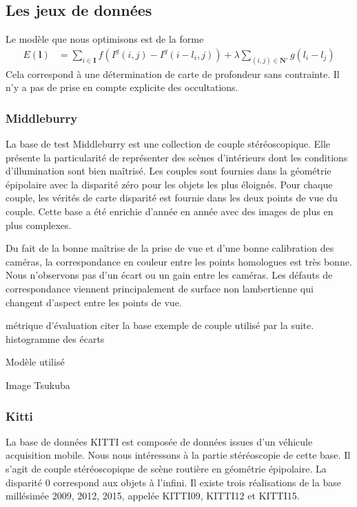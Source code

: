 \documentclass[../main/These_Mathias_Paget.tex]{subfiles}
\begin{document}
\subsection{Les jeux de données}

Le modèle que nous optimisons est de la forme
\begin{equation}
\begin{aligned}
E(\boldsymbol{l}) &= \sum_{i \in \boldsymbol{I}}{ f( I^g(i,j) - I^g(i-l_i,j) )} + 
\lambda \sum_{(i,j) \in \boldsymbol{N'}}{ g(l_i-l_j) }
\end{aligned}
\end{equation}
Cela correspond à une détermination de carte de profondeur sans contrainte. Il n'y a pas de prise en compte explicite des occultations.

\subsubsection{Middleburry}

La base de test Middleburry est une collection de couple stéréoscopique. Elle présente la particularité de représenter des scènes d'intérieurs dont les conditions d’illumination sont bien maîtrisé. Les couples sont fournies dans la géométrie épipolaire avec la disparité zéro pour les objets les plus éloignés. Pour chaque couple, les vérités de carte disparité est fournie dans les deux points de vue du couple. Cette base a été enrichie d'année en année avec des images de plus en plus complexes.

Du fait de la bonne maîtrise de la prise de vue et d'une bonne calibration des caméras, la correspondance en couleur entre les points homologues est très bonne. Nous n'observons pas d'un écart ou un gain entre les caméras. Les défauts de correspondance viennent principalement de surface non lambertienne qui changent d'aspect entre les points de vue.

métrique d’évaluation
citer la base
exemple de couple utilisé par la suite.
histogramme des écarts

Modèle utilisé

Image Tsukuba

\subsubsection{Kitti}

La base de données KITTI est composée de données issues d'un véhicule acquisition mobile. Nous nous intéressons à la partie stéréoscopie de cette base. Il s'agit de couple stéréoscopique de scène routière en géométrie épipolaire. La disparité 0 correspond aux objets à l'infini. Il existe trois réalisations de la base millésimée 2009, 2012, 2015, appelée KITTI09, KITTI12 et KITTI15.
\end{document}
